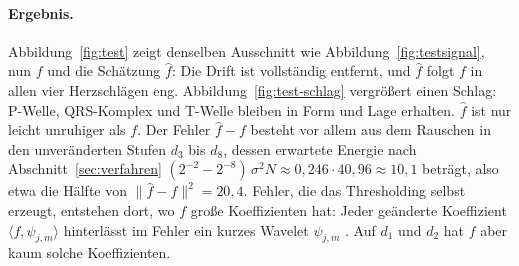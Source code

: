 \documentclass[a4paper,11pt,bibliography=totoc,listof=totoc,headinclude=true,cleardoublepage=empty,oneside]{scrbook}
\theoremstyle{plain}
\theoremstyle{definition}
\newcommand{\scal}[2]{\langle #1, #2 \rangle}
\newcommand{\norm}[1]{\lVert #1 \rVert}
\begin{document}
\paragraph{Ergebnis.}
Abbildung~\ref{fig:test} zeigt denselben Ausschnitt wie
Abbildung~\ref{fig:testsignal}, nun $f$ und die Schätzung $\hat f$: Die Drift
ist vollständig entfernt, und $\hat f$ folgt $f$ in allen vier Herzschlägen
eng. Abbildung~\ref{fig:test-schlag} vergrö\ss ert einen Schlag: P-Welle,
QRS-Komplex und T-Welle bleiben in Form und Lage erhalten. $\hat f$ ist nur
leicht unruhiger als $f$. Der Fehler $\hat f - f$ besteht vor allem aus dem Rauschen in den unveränderten Stufen
$d_3$ bis $d_8$, dessen erwartete Energie nach
Abschnitt~\ref{sec:verfahren}
$(2^{-2} - 2^{-8})\,\sigma^2 N \approx 0{,}246 \cdot 40{,}96 \approx 10{,}1$
beträgt, also etwa die Hälfte von $\norm{\hat f - f}^2 = 20{,}4$.
Fehler, die das Thresholding selbst erzeugt, entstehen dort, wo $f$ gro\ss e
Koeffizienten hat: Jeder geänderte Koeffizient $\scal{f}{\psi_{j,m}}$
hinterlässt im Fehler ein kurzes Wavelet $\psi_{j,m}$
\cite[Kap.~11.3.1]{mallat}. %
Auf $d_1$ und $d_2$ hat $f$ aber kaum solche Koeffizienten.
\end{document}
